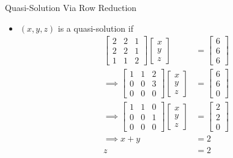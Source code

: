 \documentclass[usenames,dvipsnames,10pt]{beamer}
\begin{document}
\begin{frame}
  {Quasi-Solution Via Row Reduction}

  \begin{itemize}
  \item $(x,y,z)$ is a quasi-solution if
    \begin{align*}
      \begin{bmatrix} 2 & 2 & 1 \\ 2 & 2 & 1 \\ 1 & 1 & 2 \end{bmatrix}\begin{bmatrix} x \\ y \\ z \end{bmatrix}
      &= \begin{bmatrix} 6 \\ 6 \\ 6 \end{bmatrix}\\
      \implies
      \begin{bmatrix} 1 & 1 & 2 \\ 0 & 0 & 3 \\ 0 & 0 & 0\end{bmatrix} \begin{bmatrix} x \\ y \\ z \end{bmatrix}
      &= \begin{bmatrix} 6 \\ 6 \\ 0 \end{bmatrix}\\
      \implies
      \begin{bmatrix} 1 & 1 & 0 \\ 0 & 0 & 1 \\ 0 & 0 & 0\end{bmatrix} \begin{bmatrix} x \\ y \\ z \end{bmatrix}
      &= \begin{bmatrix} 2 \\ 2 \\ 0 \end{bmatrix}\\
      \implies x + y &= 2\\
      z &= 2
    \end{align*}
  \end{itemize}
\end{frame}
\end{document}
